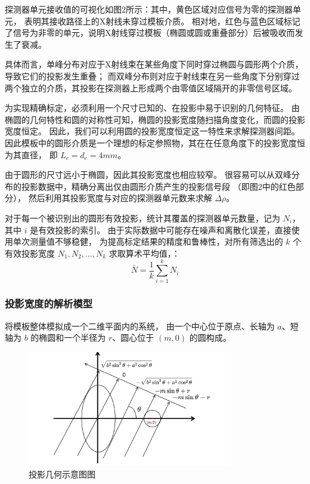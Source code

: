 探测器单元接收值的可视化如图2所示：其中，黄色区域对应信号为零的探测器单元，
表明其接收路径上的X射线未穿过模板介质。
相对地，红色与蓝色区域标记了信号为非零的单元，说明X射线穿过模板（椭圆或圆或重叠部分）后被吸收而发生了衰减。

具体而言，单峰分布对应于X射线束在某些角度下同时穿过椭圆与圆形两个介质，导致它们的投影发生重叠；
而双峰分布则对应于射线束在另一些角度下分别穿过两个独立的介质，其投影在探测器上形成两个由零值区域隔开的非零信号区域。

为实现精确标定，必须利用一个尺寸已知的、在投影中易于识别的几何特征。
由椭圆的几何特性和圆的对称性可知，椭圆的投影宽度随扫描角度变化，而圆的投影宽度恒定。
因此，我们可以利用圆的投影宽度恒定这一特性来求解探测器间距。
因此模板中的圆形介质是一个理想的标定参照物，其在在任意角度下的投影宽度恒为其直径，
即 $L_c = d_c = 4 mm$。

由于圆形的尺寸远小于椭圆，因此其投影宽度也相应较窄。
很容易可以从双峰分布的投影数据中，精确分离出仅由圆形介质产生的投影信号段
（即图2中的红色部分），
然后利用其投影宽度与对应的探测器单元数来求解 $\Delta\rho$。

对于每一个被识别出的圆形有效投影，统计其覆盖的探测器单元数量，记为 $N_i$，其中 $i$ 是有效投影的索引。
由于实际数据中可能存在噪声和离散化误差，直接使用单次测量值不够稳健，
为提高标定结果的精度和鲁棒性，对所有筛选出的 $k$ 个有效投影宽度 $N_1, N_2, ..., N_k$ 求取算术平均值，：
\begin{equation}
    \bar{N} = \frac{1}{k} \sum_{i=1}^{k} N_i
    \label{eq:average_N}
\end{equation}



\subsubsection{投影宽度的解析模型}
将模板整体模拟成一个二维平面内的系统，
由一个中心位于原点、长轴为 $a$、短轴为 $b$ 的椭圆和一个半径为 $r$、圆心位于 $(m, 0)$ 的圆构成。
\begin{figure}[h] 
    \centering 
    \includegraphics[width=0.8\textwidth]{几何图.png} 
    \caption{投影几何示意图图} 
    \label{fig:category}
\end{figure}

